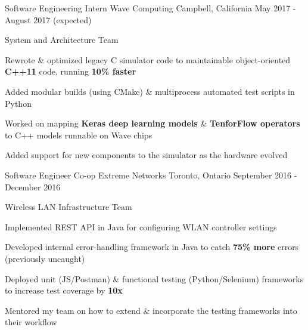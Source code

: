 


\begin{cventries}


\cventry
{Software Engineering Intern}
{Wave Computing}
{Campbell, California}
{May 2017 - August 2017 (expected)}
{ %
System and Architecture Team
\begin{cvitems}
\item[]
\item {Rewrote \& optimized legacy C simulator code to maintainable object-oriented \textbf{C++11} code, running \textbf{10\% faster}}
\item {Added modular builds (using CMake) \& multiprocess automated test scripts in Python}
\item {Worked on mapping \textbf{Keras deep learning models} \& \textbf{TenforFlow operators} to C++ models runnable on Wave chips}
\item {Added support for new components to the simulator as the hardware evolved}
\end{cvitems}
}


\cventry
{Software Engineer Co-op}
{Extreme Networks}
{Toronto, Ontario}
{September 2016 - December 2016}
{ %
Wireless LAN Infrastructure Team
\begin{cvitems}
\item[]
\item {Implemented REST API in Java for configuring WLAN controller settings}
\item {Developed internal error-handling framework in Java to catch \textbf{75\% more} errors (previously uncaught)}
\item {Deployed unit (JS/Postman) \& functional testing (Python/Selenium) frameworks to increase test coverage by \textbf{10x}}
\item {Mentored my team on how to extend \& incorporate the testing frameworks into their workflow}
\end{cvitems}
}


\end{cventries}
